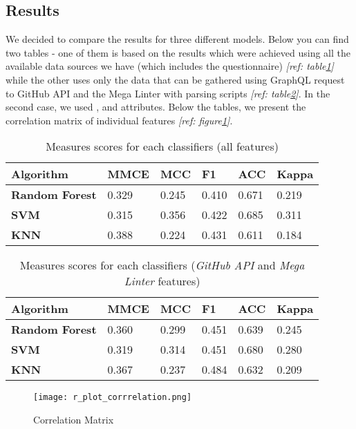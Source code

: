 \subsection{Results}
\label{sec:results}

We decided to compare the results for three different models. Below you can find two tables - one of them is based on the results which were achieved using all the available data sources we have (which includes the questionnaire) \textit{[ref: table\ref{table:1}]}  while the other uses only the data that can be gathered using GraphQL request to GitHub API and the Mega Linter with parsing scripts \textit{[ref: table\ref{table:2}]}. In the second case, we used ,  and  attributes. Below the tables, we present the correlation matrix of individual features \textit{[ref: figure\ref{fig:correlation-matrix}]}. 

\begin{table}[h!]
\centering
\begin{tabular}{ | m{5em} | m{5em}| m{5em} | m{5em}| m{5em} | m{5em}| } 
\hline
 Algorithm & \textbf{MMCE} & \textbf{MCC} & \textbf{F1} & \textbf{ACC} & \textbf{Kappa}\\ 
 \hline
 \textbf{Random Forest} & 0.329 & 0.245 & 0.410 & 0.671 & 0.219 \\ 
\hline
 \textbf{SVM} & 0.315 & 0.356 & 0.422 & 0.685 & 0.311 \\ 
\hline
 \textbf{KNN} & 0.388 & 0.224 & 0.431 & 0.611 & 0.184\\ 
\hline
\end{tabular}
\caption{Measures scores for each classifiers (all features)}
\label{table:1}
\end{table}

\begin{table}[h!]
\centering
\begin{tabular}{ | m{5em} | m{5em}| m{5em} | m{5em}| m{5em} | m{5em}| } 
\hline
 Algorithm & \textbf{MMCE} & \textbf{MCC} & \textbf{F1} & \textbf{ACC} & \textbf{Kappa}\\ 
 \hline
 \textbf{Random Forest} & 0.360 & 0.299 & 0.451 & 0.639 & 0.245 \\ 
\hline
 \textbf{SVM} & 0.319 & 0.314 & 0.451 & 0.680 & 0.280 \\ 
\hline
 \textbf{KNN} & 0.367 & 0.237 & 0.484 & 0.632 & 0.209\\ 
\hline
\end{tabular}
\caption{Measures scores for each classifiers (\emph{GitHub API} and \emph{Mega Linter} features)}
\label{table:2}
\end{table}

\begin{figure}[htp]
\centering
\texttt{[image: r\_plot\_corrrelation.png]}
\caption{Correlation Matrix}
\label{fig:correlation-matrix}
\end{figure}
